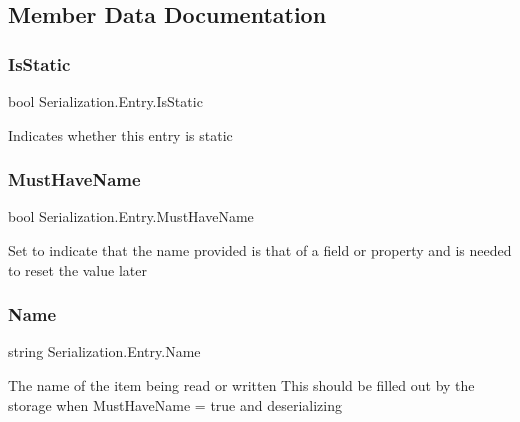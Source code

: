 \subsection{Member Data Documentation}
\mbox{\label{class_serialization_1_1_entry_aa2f98ee039ca25cefe57774a76903556}} 
\subsubsection{\texorpdfstring{Is\+Static}{IsStatic}}
{\footnotesize\ttfamily bool Serialization.\+Entry.\+Is\+Static}



Indicates whether this entry is static 

\mbox{\label{class_serialization_1_1_entry_a09a13ff1f6b299c4728a734b307de2b5}} 
\subsubsection{\texorpdfstring{Must\+Have\+Name}{MustHaveName}}
{\footnotesize\ttfamily bool Serialization.\+Entry.\+Must\+Have\+Name}



Set to indicate that the name provided is that of a field or property and is needed to reset the value later 

\mbox{\label{class_serialization_1_1_entry_a27386eb83718b39bfc36c67585639247}} 
\subsubsection{\texorpdfstring{Name}{Name}}
{\footnotesize\ttfamily string Serialization.\+Entry.\+Name}



The name of the item being read or written This should be filled out by the storage when Must\+Have\+Name = true and deserializing 

